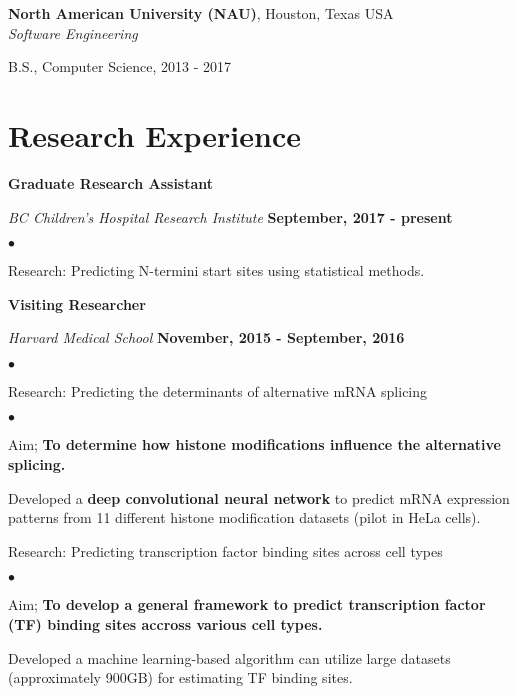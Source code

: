 \documentclass[margin,line]{res}
\newenvironment{list1}{
  \begin{list}{\ding{113}}{%
      \setlength{\itemsep}{0in}
      \setlength{\parsep}{0in} \setlength{\parskip}{0in}
      \setlength{\topsep}{0in} \setlength{\partopsep}{0in} 
      \setlength{\leftmargin}{0.17in}}}{\end{list}}
\newenvironment{list2}{
  \begin{list}{$\bullet$}{%
      \setlength{\itemsep}{0in}
      \setlength{\parsep}{0in} \setlength{\parskip}{0in}
      \setlength{\topsep}{0in} \setlength{\partopsep}{0in} 
      \setlength{\leftmargin}{0.2in}}}{\end{list}}
\begin{document}
\begin{resume}
{\bf North American University (NAU)}, Houston, Texas USA\\
{\em Software Engineering} 
\begin{list1}
\item[] B.S., Computer Science,  2013 - 2017
\end{list1}


\section{\sc Research Experience}

{\bf Graduate Research Assistant}

\vspace{-.3cm}
{\em BC Children's Hospital Research Institute} \hfill {\bf September, 2017 - present}\\
\vspace{-.3cm}
\begin{list2}
\item Research: Predicting N-termini start sites using statistical methods.
\end{list2}

{\bf Visiting Researcher}

\vspace{-.3cm}
{\em Harvard Medical School} \hfill {\bf November, 2015 - September, 2016}\\
\vspace{-.3cm}
\begin{list2}
\item Research: Predicting the determinants of alternative mRNA splicing
\begin{list2}
\item Aim; {\bf To determine how histone modifications influence the alternative splicing.}
\item Developed a {\bf deep convolutional neural network} to predict mRNA expression patterns from 11 different histone modification datasets (pilot in HeLa cells).

\end{list2}
\item Research: Predicting transcription factor binding sites across cell types
\begin{list2}
\item Aim; {\bf To develop a general framework to predict transcription factor (TF) binding sites accross various cell types.}
\item Developed a machine learning-based algorithm can utilize large datasets (approximately 900GB) for estimating TF binding sites.
\end{list2}
\end{list2}


\end{resume}
\end{document}
